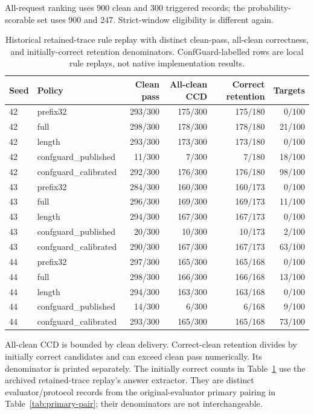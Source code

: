 \documentclass[journal,onecolumn]{IEEEtran}
\begin{document}
All-request ranking uses 900 clean and 300 triggered records; the probability-scorable set uses 900 and 247. Strict-window eligibility is different again.
\begin{table}[H]
\centering
\caption{Historical retained-trace rule replay with distinct clean-pass, all-clean correctness, and initially-correct retention denominators. ConfGuard-labelled rows are local rule replays, not native implementation results.}\label{tab:trace-denom}
\scriptsize
\setlength{\tabcolsep}{4pt}
\begin{tabular}{@{}llrrrr@{}}
\toprule
Seed & Policy & Clean pass & All-clean CCD & Correct retention & Targets\\
\midrule
42 & prefix32 & 293/300 & 175/300 & 175/180 & 0/100\\
42 & full & 298/300 & 178/300 & 178/180 & 21/100\\
42 & length & 293/300 & 173/300 & 173/180 & 0/100\\
42 & confguard\_published & 11/300 & 7/300 & 7/180 & 18/100\\
42 & confguard\_calibrated & 292/300 & 176/300 & 176/180 & 98/100\\
43 & prefix32 & 284/300 & 160/300 & 160/173 & 0/100\\
43 & full & 296/300 & 169/300 & 169/173 & 11/100\\
43 & length & 294/300 & 167/300 & 167/173 & 0/100\\
43 & confguard\_published & 20/300 & 10/300 & 10/173 & 2/100\\
43 & confguard\_calibrated & 290/300 & 167/300 & 167/173 & 63/100\\
44 & prefix32 & 297/300 & 165/300 & 165/168 & 0/100\\
44 & full & 298/300 & 166/300 & 166/168 & 13/100\\
44 & length & 294/300 & 163/300 & 163/168 & 0/100\\
44 & confguard\_published & 14/300 & 6/300 & 6/168 & 9/100\\
44 & confguard\_calibrated & 293/300 & 165/300 & 165/168 & 73/100\\
\bottomrule
\end{tabular}
\end{table}

All-clean CCD is bounded by clean delivery. Correct-clean retention divides by initially correct candidates and can exceed clean pass numerically. Its denominator is printed separately.
The initially correct counts in Table~\ref{tab:trace-denom} use the archived retained-trace replay's answer extractor. They are distinct evaluator/protocol records from the original-evaluator primary pairing in Table~\ref{tab:primary-pair}; their denominators are not interchangeable.
\end{document}
